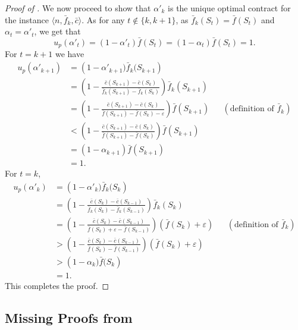 \documentclass[11pt]{article}
\newcommand{\eps}{\varepsilon}
\newcommand{\feq}{\bar{f}}
\newcommand{\ceq}{\bar{c}}
\begin{document}
\begin{proof}[Proof of ]
    We now proceed to show that $\alpha'_k$ is the unique optimal contract for the instance $\langle n, \feq_k, \ceq \rangle$.
    As for any $t \notin \{k,k+1\}$, as $\feq_k(S_t) = \feq(S_t)$ and $\alpha_t = \alpha'_{t}$, we get that 
    $$
    u_p(\alpha'_t) = (1-\alpha'_t)\feq(S_t) =(1-\alpha_t)\feq(S_t) = 1.
    $$
    For $t = k+1$ we have
    \begin{align*}
    u_p(\alpha'_{k+1})
    &=
    \left(1-\alpha'_{k+1})\feq_k(S_{k+1}\right) \\
    &=
    \left(1-\frac{\ceq(S_{k+1}) - \ceq(S_{k})}{\feq_k(S_{k+1}) - \feq_k(S_{k})}\right)\feq_k(S_{k+1}) \\
    &=
    \left(1-\frac{\ceq(S_{k+1}) - \ceq(S_{k})}{\feq(S_{k+1}) - \feq(S_{k}) - \eps}  \right)\feq(S_{k+1}) && (\text{definition of } \feq_k) \\
    &<
    \left(1-\frac{\ceq(S_{k+1}) - \ceq(S_{k})}{\feq(S_{k+1}) - \feq(S_{k})}  \right)\feq(S_{k+1}) \\
    &=
    (1-\alpha_{k+1})\feq(S_{k+1}) \\
    &=
    1.
    \end{align*}
    For $t = k$,
    \begin{align*}
    u_p(\alpha'_{k})
    &=
    \left(1-\alpha'_{k})\feq_k(S_{k}\right) \\
    &=
    \left(1-\frac{\ceq(S_{k}) - \ceq(S_{k-1})}{\feq_k(S_{k}) - \feq_k(S_{k-1})}\right)\feq_k(S_{k}) \\
    &=
    \left(1-\frac{\ceq(S_{k}) - \ceq(S_{k-1})}{\feq(S_{k}) + \eps - \feq(S_{k-1})}\right)(\feq(S_{k}) + \eps) && (\text{definition of } \feq_k) \\
    &>
    \left(1-\frac{\ceq(S_{k}) - \ceq(S_{k-1})}{\feq(S_{k}) - \feq(S_{k-1})}\right)(\feq(S_{k}) + \eps) \\
    &>
    \left(1-\alpha_{k})\feq(S_{k}\right) \\
    &=
    1.
    \end{align*}   
    This completes the proof.
\end{proof}


\subsection{Missing Proofs from }\label{sec:Omitted_CC_submod_fc}
\end{document}
